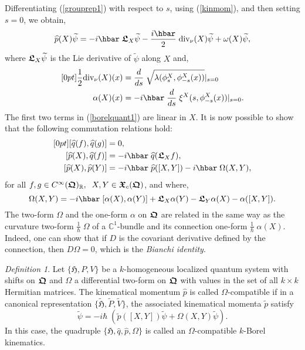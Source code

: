 \documentclass[12pt]{amsart}
\numberwithin{equation}{section}
\theoremstyle{remark}
\newcommand\HH{\mathfrak H}
\newcommand\RR{\mathbb R}
\newtheorem{defi}{Definition}[section]
\newcommand{\bedefin}{\begin{defi}}
\newcommand{\be}{\begin{equation}}
\newcommand{\en}{\end{equation}}
\newcommand{\htil}{\widetilde{\mathfrak H}}
\newcommand{\bfrakQ}{\mbox{\boldmath $\mathfrak Q$}}
\newcommand{\bfrakX}{\mbox{\boldmath $\mathfrak X$}}
\newcommand{\bfrakL}{\mbox{\boldmath $\mathfrak L$}}
\newcommand{\CinfRQ}{C^\infty(\bfrakQ)_{\RR}}
\begin{document}
Differentiating (\ref{grouprep1}) with respect to $s$, using (\ref{kinmom}),
and then setting $s=0$, we obtain,
\be
 \widehat{p} (X)\widetilde\psi = -i\hbar\;\bfrakL_X \widetilde\psi -
      \frac {i\hbar}2 \;\mbox{\rm div}_\nu (X) \widetilde\psi + \omega
(X)\widetilde\psi,
\label{borelquant1}
\en
where $\bfrakL_X \widetilde\psi$ is the Lie derivative of $\widetilde\psi$
along $X$ and,
\be \begin{aligned}[0pt]
 \frac 12 \mbox{\rm div}_\nu (X)(x) &= \frac d{ds}\;
         \sqrt{\lambda (\phi^X_s, \phi^X_{-s} (x))} \vert_{s=0}   \\
\alpha (X)(x) &= -i\hbar\; \frac d{ds}\;\xi^X (s, \phi^X_{-s} (x))\vert_{s=0}.
\end{aligned}  \label{borelquant2}  \en
The first two terms in (\ref{borelquant1}) are linear in $X$. It is now
possible to show that the following commutation relations hold:
\be \begin{aligned}[0pt]
  [\widehat{q}(f), \widehat{q}(g)] &= 0,  \\
\lbrack\widehat{p}(X),\widehat{q}(f)\rbrack  &=
  -i\hbar\;\widehat{q}(\bfrakL_X f),     \\
  \lbrack\widehat{p}(X),\widehat{p}(Y)\rbrack &= -i\hbar\;\widehat{p}([X,Y])
      -i\hbar\;\Omega (X,Y),
\end{aligned} \label{borelquant3} \en
for all $f, g \in \CinfRQ,\;\; X, Y \in \bfrakX_c (\bfrakQ )$, and where,
\be
  \Omega (X,Y) = -i\hbar\; [\alpha (X) , \alpha (Y)] + \bfrakL_X \alpha (Y) -
     \bfrakL_Y \alpha (X) -\alpha ([X,Y]) .
\label{borelquant4}
\en
The two-form $\Omega$ and the one-form $\alpha$ on $\bfrakQ$
are related in the same way as the curvature two-form
$\displaystyle{\frac 1\hbar}\;\Omega$ of a ${\mathbb C}^1$-bundle and its
connection one-form $\displaystyle{\frac 1\hbar}\;\alpha (X)$. Indeed, one can
show that if $D$ is the covariant derivative defined by the connection, then
$D\Omega = 0$, which is the {\em Bianchi identity\/}.

\bedefin
Let $\{\HH , P, V\}$ be a $k$-homogeneous localized quantum system with shifts
on $\bfrakQ$ and $\Omega$ a differential two-form on $\bfrakQ$ with values in
the set of all $k\times k$ Hermitian matrices. The kinematical momentum
$\widehat{p}$ is called $\Omega$-compatible if in a canonical representation
$\{\htil , \widetilde{P}, \widetilde{V}\}$, the associated kinematical momenta
$\widetilde{p}$ satisfy
\be
   [\widetilde{p}(X), \widetilde{p}(Y)]\widetilde{\psi}
   = -i\hbar \;(\widetilde{p}([X,Y])
    \widetilde{\psi} + \Omega (X,Y)\widetilde{\psi}).
\label{omegacomp}
\en
In this case, the quadruple $\{\HH , \widehat{q}, \widehat{p}, \Omega \}$ is
called an $\Omega$-compatible $k$-Borel kinematics.
\end{defi}
\end{document}
